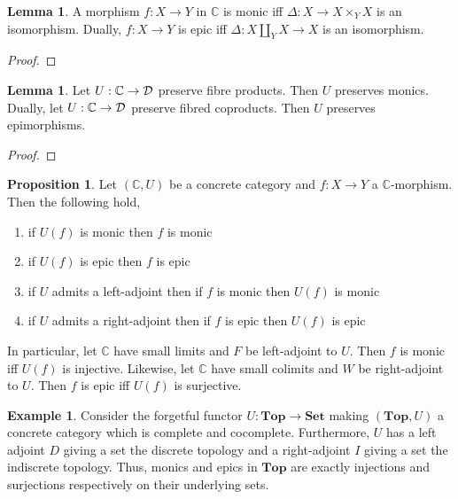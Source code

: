 \documentclass[12pt]{extarticle}
\newcommand{\Top}{\mathbf{Top}}
\newcommand{\Set}{\mathbf{Set}}
\theoremstyle{definition}
\newtheorem{lemma}[theorem]{Lemma}
\newtheorem{proposition}[theorem]{Proposition}
\newtheorem{example}[theorem]{Example}
\newcommand{\C}{\mathbb{C}}
\begin{document}
\begin{lemma}
A morphism $f : X \to Y$ in $\C$ is monic iff $\Delta : X \to X \times_Y X$ is an isomorphism. Dually, $f : X \to Y$ is epic iff $\Delta : X \coprod_Y X \to X$ is an isomorphism. 
\end{lemma}

\begin{proof}

\end{proof}

\begin{lemma}
Let $U : \C \to \D$ preserve fibre products. Then $U$ preserves monics. Dually, let $U : \C \to \D$ preserve fibred coproducts. Then $U$ preserves epimorphisms. 
\end{lemma}

\begin{proof}

\end{proof}

\begin{proposition}
Let $(\C, U)$ be a concrete category and $f : X \to Y$ a $\C$-morphism. Then the following hold,
\begin{enumerate}
\item if $U(f)$ is monic then $f$ is monic
\item if $U(f)$ is epic then $f$ is epic
\item if $U$ admits a left-adjoint then if $f$ is monic then $U(f)$ is monic
\item if $U$ admits a right-adjoint then if $f$ is epic then $U(f)$ is epic
\end{enumerate}
In particular, let $\C$ have small limits and $F$ be left-adjoint to $U$. Then $f$ is monic iff $U(f)$ is injective. Likewise, let $\C$ have small colimits and $W$ be right-adjoint to $U$. Then $f$ is epic iff $U(f)$ is surjective. 
\end{proposition}

\begin{example}
Consider the forgetful functor $U : \Top \to \Set$ making $(\Top, U)$ a concrete category which is complete and cocomplete. Furthermore, $U$ has a left adjoint $D$ giving a set the discrete topology and a right-adjoint $I$ giving a set the indiscrete topology. Thus, monics and epics in $\Top$ are exactly injections and surjections respectively on their underlying sets. 
\end{example}

\newcommand{\Haus}{\mathbf{Haus}}
\end{document}
